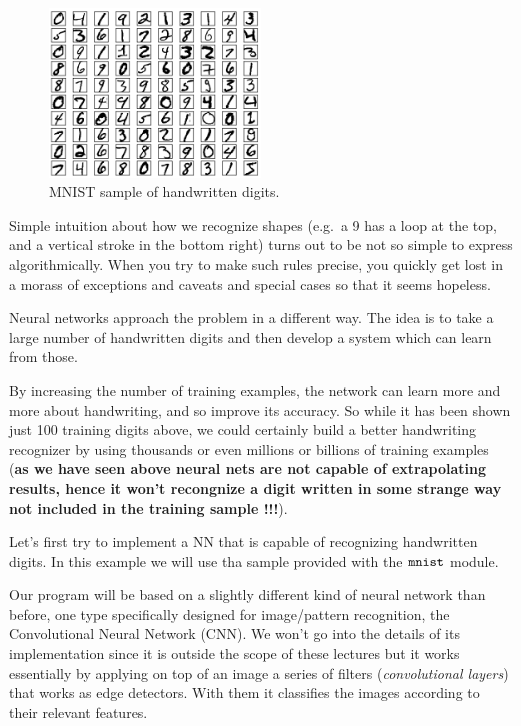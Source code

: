 \begin{figure}[htb]
	\centering
	\includegraphics[width=0.5\textwidth]{figures/mnist_100_digits}
	\caption{MNIST sample of handwritten digits.}
	\label{fig:mnist}
\end{figure}

Simple intuition about how we recognize shapes (e.g.~a 9 has a loop at
the top, and a vertical stroke in the bottom right) turns out to be not
so simple to express algorithmically. When you try to make such rules
precise, you quickly get lost in a morass of exceptions and caveats and
special cases so that it seems hopeless.

Neural networks approach the problem in a different way. The idea is to
take a large number of handwritten digits and then develop a system
which can learn from those.

By increasing the number of training examples, the network can learn
more and more about handwriting, and so improve its accuracy. So while
it has been shown just 100 training digits above, we could certainly
build a better handwriting recognizer by using thousands or even
millions or billions of training examples (\textbf{as we have seen above
	neural nets are not capable of extrapolating results, hence it won't
	recongnize a digit written in some strange way not included in the
	training sample !!!}).

Let's first try to implement a NN that is capable of recognizing
handwritten digits. In this example we will use tha sample provided with
the \(\tt{mnist}\) module.

Our program will be based on a slightly different kind of neural network
than before, one type specifically designed for image/pattern
recognition, the Convolutional Neural Network (CNN). We won't go into
the details of its implementation since it is outside the scope of these
lectures but it works essentially by applying on top of an image a
series of filters (\emph{convolutional layers}) that works as edge
detectors. With them it classifies the images according to their
relevant features.

